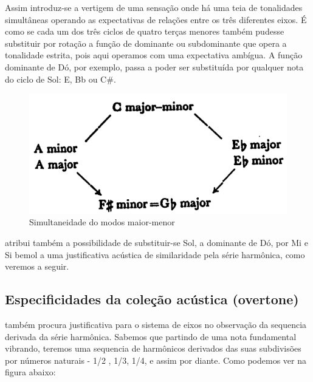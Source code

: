 \documentclass[
	12pt,				%
	openright,			%
	twoside,			%
	a4paper,			%
	english,			%
	french,				%
	spanish,			%
	brazil				%
	]{abntex2}
\begin{document}
Assim introduz-se a vertigem de uma sensação onde há uma teia de tonalidades simultâneas operando as expectativas de relações entre os três diferentes eixos. É como se cada um dos três ciclos de quatro terças menores também pudesse substituir por rotação a função de dominante ou subdominante que opera a tonalidade estrita, pois aqui operamos com uma expectativa ambígua. A função dominante de Dó, por exemplo, passa a poder ser substituída por qualquer nota do ciclo de Sol: E, Bb ou C\#.

\begin{figure}[!h]
	\caption{\label{fig_grafico}Simultaneidade do modos maior-menor }
	\begin{center}
	    \includegraphics[scale=0.3]{axis/maiormenor.png}
	\end{center}
\end{figure}

 atribui também a possibilidade de substituir-se Sol, a dominante de Dó, por Mi e Si bemol a uma justificativa acústica de similaridade pela série harmônica, como veremos a seguir. 



\subsection{Especificidades da coleção acústica (overtone)}

 também procura  justificativa para o sistema de eixos no observação da sequencia derivada da série harmônica. Sabemos que partindo de uma nota fundamental vibrando, teremos uma sequencia de harmônicos derivados das suas subdivisões por números naturais - 1/2 , 1/3, 1/4, e assim por diante. Como podemos ver na figura abaixo:
\end{document}
